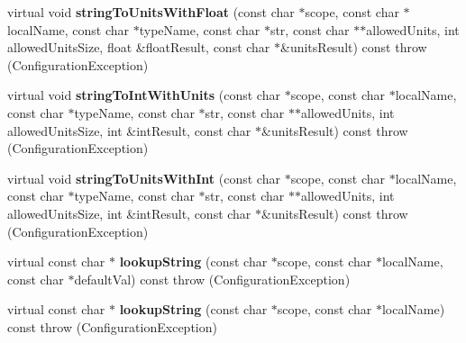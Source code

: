 \begin{DoxyCompactItemize}
\item 
\hypertarget{classCONFIG4CPP__NAMESPACE_1_1ConfigurationImpl_af8a5661065df7feb73768ed866d99352}{virtual void {\bfseries string\-To\-Units\-With\-Float} (const char $\ast$scope, const char $\ast$local\-Name, const char $\ast$type\-Name, const char $\ast$str, const char $\ast$$\ast$allowed\-Units, int allowed\-Units\-Size, float \&float\-Result, const char $\ast$\&units\-Result) const   throw (\-Configuration\-Exception)}\label{classCONFIG4CPP__NAMESPACE_1_1ConfigurationImpl_af8a5661065df7feb73768ed866d99352}

\item 
\hypertarget{classCONFIG4CPP__NAMESPACE_1_1ConfigurationImpl_ad577f9e1b7cb462c4872c15facb151d8}{virtual void {\bfseries string\-To\-Int\-With\-Units} (const char $\ast$scope, const char $\ast$local\-Name, const char $\ast$type\-Name, const char $\ast$str, const char $\ast$$\ast$allowed\-Units, int allowed\-Units\-Size, int \&int\-Result, const char $\ast$\&units\-Result) const   throw (\-Configuration\-Exception)}\label{classCONFIG4CPP__NAMESPACE_1_1ConfigurationImpl_ad577f9e1b7cb462c4872c15facb151d8}

\item 
\hypertarget{classCONFIG4CPP__NAMESPACE_1_1ConfigurationImpl_a6d6017eddb59e8df0d680b0fcc960914}{virtual void {\bfseries string\-To\-Units\-With\-Int} (const char $\ast$scope, const char $\ast$local\-Name, const char $\ast$type\-Name, const char $\ast$str, const char $\ast$$\ast$allowed\-Units, int allowed\-Units\-Size, int \&int\-Result, const char $\ast$\&units\-Result) const   throw (\-Configuration\-Exception)}\label{classCONFIG4CPP__NAMESPACE_1_1ConfigurationImpl_a6d6017eddb59e8df0d680b0fcc960914}

\item 
\hypertarget{classCONFIG4CPP__NAMESPACE_1_1ConfigurationImpl_a720bcd65c51f5a36ea999f051e5819dc}{virtual const char $\ast$ {\bfseries lookup\-String} (const char $\ast$scope, const char $\ast$local\-Name, const char $\ast$default\-Val) const   throw (\-Configuration\-Exception)}\label{classCONFIG4CPP__NAMESPACE_1_1ConfigurationImpl_a720bcd65c51f5a36ea999f051e5819dc}

\item 
\hypertarget{classCONFIG4CPP__NAMESPACE_1_1ConfigurationImpl_ab9e1ca48fcf621b2b80a370f6789b0a6}{virtual const char $\ast$ {\bfseries lookup\-String} (const char $\ast$scope, const char $\ast$local\-Name) const   throw (\-Configuration\-Exception)}\label{classCONFIG4CPP__NAMESPACE_1_1ConfigurationImpl_ab9e1ca48fcf621b2b80a370f6789b0a6}


\end{DoxyCompactItemize}

